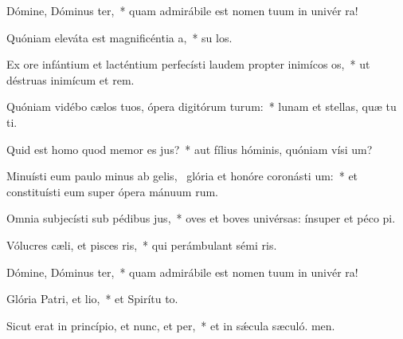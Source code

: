 \item Dómine, Dóminus ter,~* quam admirábile est nomen tuum in univér ra!
\item Quóniam eleváta est magnificéntia a,~* su los.
\item Ex ore infántium et lacténtium perfecísti laudem propter inimícos os,~* ut déstruas inimícum et rem.
\item Quóniam vidébo cælos tuos, ópera digitórum turum:~* lunam et stellas, quæ tu ti.
\item Quid est homo quod memor es jus?~* aut fílius hóminis, quóniam vísi um?
\item Minuísti eum paulo minus ab gelis,~\pscross{} glória et honóre coronásti um:~* et constituísti eum super ópera mánuum rum.
\item Omnia subjecísti sub pédibus jus,~* oves et boves univérsas: ínsuper et péco pi.
\item Vólucres cæli, et pisces ris,~* qui perámbulant sémi ris.
\item Dómine, Dóminus ter,~* quam admirábile est nomen tuum in univér ra!
\item Glória Patri, et lio,~* et Spirítu to.
\item Sicut erat in princípio, et nunc, et per,~* et in sǽcula sæculó. men.
